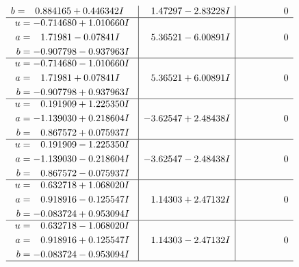 \documentclass[1p]{elsarticle_modified}
\theoremstyle{definition}
\begin{document}
$$\begin{array}{c|c|c}
\begin{aligned}
b &= \phantom{-}0.884165 + 0.446342 I\end{aligned}
 & \phantom{-}1.47297 - 2.83228 I & \phantom{-0.000000 } 0 \\ \hline\begin{aligned}
u &= -0.714680 + 1.010660 I \\
a &= \phantom{-}1.71981 - 0.07841 I \\
b &= -0.907798 - 0.937963 I\end{aligned}
 & \phantom{-}5.36521 - 6.00891 I & \phantom{-0.000000 } 0 \\ \hline\begin{aligned}
u &= -0.714680 - 1.010660 I \\
a &= \phantom{-}1.71981 + 0.07841 I \\
b &= -0.907798 + 0.937963 I\end{aligned}
 & \phantom{-}5.36521 + 6.00891 I & \phantom{-0.000000 } 0 \\ \hline\begin{aligned}
u &= \phantom{-}0.191909 + 1.225350 I \\
a &= -1.139030 + 0.218604 I \\
b &= \phantom{-}0.867572 + 0.075937 I\end{aligned}
 & -3.62547 + 2.48438 I & \phantom{-0.000000 } 0 \\ \hline\begin{aligned}
u &= \phantom{-}0.191909 - 1.225350 I \\
a &= -1.139030 - 0.218604 I \\
b &= \phantom{-}0.867572 - 0.075937 I\end{aligned}
 & -3.62547 - 2.48438 I & \phantom{-0.000000 } 0 \\ \hline\begin{aligned}
u &= \phantom{-}0.632718 + 1.068020 I \\
a &= \phantom{-}0.918916 - 0.125547 I \\
b &= -0.083724 + 0.953094 I\end{aligned}
 & \phantom{-}1.14303 + 2.47132 I & \phantom{-0.000000 } 0 \\ \hline\begin{aligned}
u &= \phantom{-}0.632718 - 1.068020 I \\
a &= \phantom{-}0.918916 + 0.125547 I \\
b &= -0.083724 - 0.953094 I\end{aligned}
 & \phantom{-}1.14303 - 2.47132 I & \phantom{-0.000000 } 0\\
 \hline 
 \end{array}$$\newpage$$\begin{array}{c|c|c}  

\end{array}$$
\end{document}
